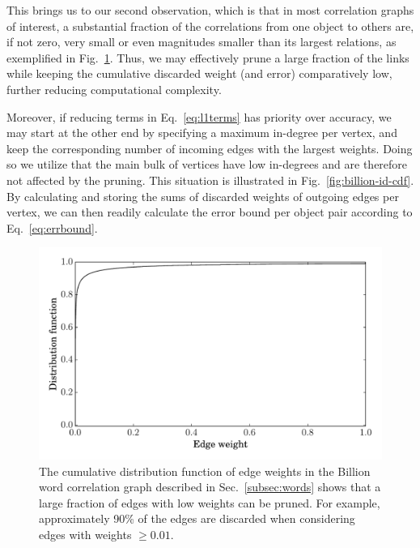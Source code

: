 \documentclass[conference]{IEEEtran}
\begin{document}
This brings us to our second observation, which is that in most correlation graphs of interest, a substantial fraction of
the correlations from one object to others are, if not zero, very small or even magnitudes smaller than its largest
relations, as exemplified in Fig.\ \ref{fig:billion-ew-cdf}. Thus, we may effectively prune a
large fraction of the links while keeping the cumulative discarded weight (and error) comparatively low, further reducing
computational complexity.

Moreover, if reducing terms in Eq.\ \ref{eq:l1terms} has priority over accuracy, we may start at the other end by specifying a 
maximum in-degree per vertex, and keep the corresponding number of incoming edges with the largest weights. Doing so 
we utilize that  the main bulk of vertices have low in-degrees and are therefore not affected by the
pruning. This situation is illustrated in Fig.\ \ref{fig:billion-id-cdf}. By calculating and storing
the sums of discarded weights of outgoing edges per vertex, we can then readily calculate the error bound per object
pair according to Eq.\ \ref{eq:errbound}.

\begin{figure}
\begin{centering}
\includegraphics[width=1.0\columnwidth]{figures/billion-ew-cdf.pdf}
\end{centering}
\caption{The cumulative distribution function of edge weights in the Billion word correlation graph described in 
Sec.\ \ref{subsec:words} shows that a large fraction of edges with low weights can be pruned. For example, 
approximately 90\% of the edges are discarded when considering edges with weights $\geq 0.01$.}
\label{fig:billion-ew-cdf}
\end{figure}
\end{document}
